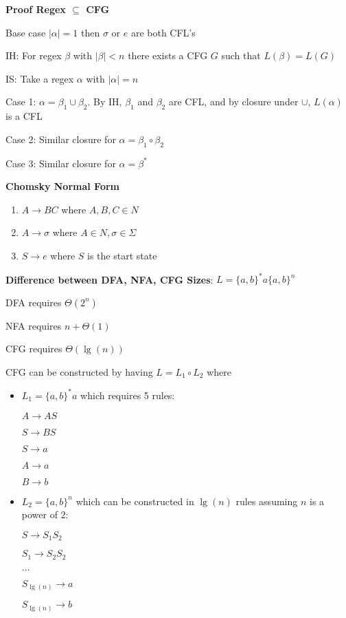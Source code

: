 \documentclass{article}
\begin{document}
  \textbf{Proof Regex $\subseteq$ CFG}

  Base case $|\alpha| = 1$ then $\sigma$ or $e$ are both CFL's

  IH: For regex $\beta$ with $|\beta| < n$ there exists a CFG $G$ such that $L(\beta) = L(G)$

  IS: Take a regex $\alpha$ with $|\alpha| = n$

  Case 1: $\alpha = \beta_1 \cup \beta_2$. By IH, $\beta_1$ and $\beta_2$ are CFL, and by closure under $\cup$, $L(\alpha)$ is a CFL
  
  Case 2: Similar closure for $\alpha = \beta_1 \circ \beta_2$

  Case 3: Similar closure for $\alpha = \beta^*$ \bigskip

  \textbf{Chomsky Normal Form}

  \begin{enumerate}
    \item $A \rightarrow BC$ where $A,B,C \in N$
    \item $A \rightarrow \sigma$ where $A \in N, \sigma \in \Sigma$
    \item $S \rightarrow e$ where $S$ is the start state
  \end{enumerate}

  \textbf{Difference between DFA, NFA, CFG Sizes}: $L = \{a, b\}^* a \{a, b\}^n$

  DFA requires $\Theta(2^n)$

  NFA requires $n + \Theta(1)$

  CFG requires $\Theta(\lg(n))$

  CFG can be constructed by having $L = L_1 \circ L_2$ where
  \begin{itemize}
    \item $L_1 = \{a, b\}^*a$ which requires 5 rules:

      $A \rightarrow AS$
      
      $S \rightarrow BS$

      $S \rightarrow a$

      $A \rightarrow a$

      $B \rightarrow b$

    \item $L_2 = \{a,b\}^n$ which can be constructed in $\lg(n)$ rules assuming $n$ is a power of $2$:

      $S \rightarrow S_1S_2$

      $S_1 \rightarrow S_2S_2$

      $\ldots$

      $S_{\lg(n)} \rightarrow a$

      $S_{\lg(n)} \rightarrow b$
  \end{itemize}
\end{document}
